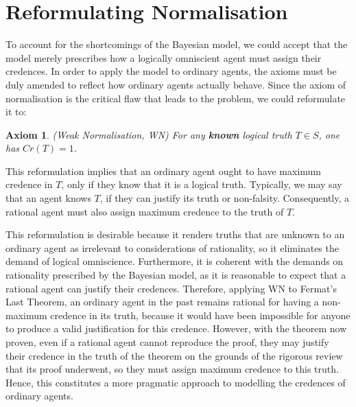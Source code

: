 \documentclass[12pt]{article}
\newtheorem{axiom}{Axiom}
\begin{document}
\section{Reformulating Normalisation}
To account for the shortcomings of the Bayesian model, we could accept that the model merely prescribes how a logically omniscient agent must assign their credences. In order to apply the model to ordinary agents, the axioms must be duly amended to reflect how ordinary agents actually behave. Since the axiom of normalisation is the critical flaw that leads to the problem, we could reformulate it to:
\begin{axiom}
    (Weak Normalisation, WN) For any \textbf{known} logical truth $T\in S$, one has $Cr(T)=1$.
\end{axiom}
This reformulation implies that an ordinary agent ought to have maximum credence in $T$, only if they know that it is a logical truth.\autocite{sep} Typically, we may say that an agent knows $T$, if they can justify its truth or non-falsity. Consequently, a rational agent must also assign maximum credence to the truth of $T$.

This reformulation is desirable because it renders truths that are unknown to an ordinary agent as irrelevant to considerations of rationality, so it eliminates the demand of logical omniscience. Furthermore, it is coherent with the demands on rationality prescribed by the Bayesian model, as it is reasonable to expect that a rational agent can justify their credences. Therefore, applying WN to Fermat's Last Theorem, an ordinary agent in the past remains rational for having a non-maximum credence in its truth, because it would have been impossible for anyone to produce a valid justification for this credence. However, with the theorem now proven, even if a rational agent cannot reproduce the proof, they may justify their credence in the truth of the theorem on the grounds of the rigorous review that its proof underwent, so they must assign maximum credence to this truth. Hence, this constitutes a more pragmatic approach to modelling the credences of ordinary agents.
\end{document}
